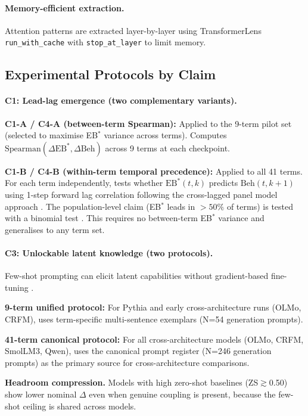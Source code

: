 \documentclass[10pt]{article} %
\begin{document}
\paragraph{Memory-efficient extraction.}
Attention patterns are extracted layer-by-layer using TransformerLens \texttt{run\_with\_cache} with \texttt{stop\_at\_layer} to limit memory.

\subsection{Experimental Protocols by Claim}

\paragraph{C1: Lead-lag emergence (two complementary variants).}

\textbf{C1-A / C4-A (between-term Spearman):} Applied to the 9-term pilot set (selected to maximise EB$^*$ variance across terms). Computes $\text{Spearman}(\Delta \text{EB}^*, \Delta \text{Beh})$ across 9 terms at each checkpoint.

\textbf{C1-B / C4-B (within-term temporal precedence):} Applied to all 41 terms. For each term independently, tests whether $\text{EB}^*(t, k)$ predicts $\text{Beh}(t, k+1)$ using 1-step forward lag correlation following the cross-lagged panel model approach \citep{hamaker2015critique}. The population-level claim (EB$^*$ leads in $>50\%$ of terms) is tested with a binomial test \citep{wilson1927probable}. This requires no between-term EB$^*$ variance and generalises to any term set.

\paragraph{C3: Unlockable latent knowledge (two protocols).}
Few-shot prompting can elicit latent capabilities without gradient-based fine-tuning \citep{brown2020language}.

\textbf{9-term unified protocol:} For Pythia and early cross-architecture runs (OLMo, CRFM), uses term-specific multi-sentence exemplars (N=54 generation prompts).

\textbf{41-term canonical protocol:} For all cross-architecture models (OLMo, CRFM, SmolLM3, Qwen), uses the canonical prompt register (N=246 generation prompts) as the primary source for cross-architecture comparisons.

\textbf{Headroom compression.} Models with high zero-shot baselines (ZS$\gtrsim$0.50) show lower nominal $\Delta$ even when genuine coupling is present, because the few-shot ceiling is shared across models.
\end{document}
